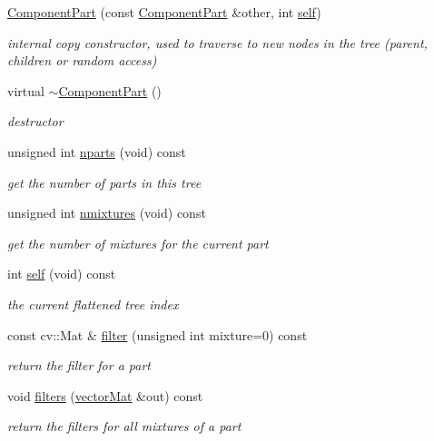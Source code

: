 \begin{DoxyCompactItemize}
\hyperlink{classComponentPart_ac0e19a42768687553d539fef60102310}{Component\-Part} (const \hyperlink{classComponentPart}{Component\-Part} \&other, int \hyperlink{classComponentPart_abe27079725188a3cb881459a6ba0abc5}{self})
\begin{DoxyCompactList}\small\item\em internal copy constructor, used to traverse to new nodes in the tree (parent, children or random access) \end{DoxyCompactList}\item 
virtual \hyperlink{classComponentPart_adc9d76c5af40cbe00a655361f1b61845}{$\sim$\-Component\-Part} ()
\begin{DoxyCompactList}\small\item\em destructor \end{DoxyCompactList}\item 
unsigned int \hyperlink{classComponentPart_a077a73d9777e77da01176248ca292d23}{nparts} (void) const 
\begin{DoxyCompactList}\small\item\em get the number of parts in this tree \end{DoxyCompactList}\item 
unsigned int \hyperlink{classComponentPart_aba1fa81c2745e5974d72f8403ad48063}{nmixtures} (void) const 
\begin{DoxyCompactList}\small\item\em get the number of mixtures for the current part \end{DoxyCompactList}\item 
int \hyperlink{classComponentPart_abe27079725188a3cb881459a6ba0abc5}{self} (void) const 
\begin{DoxyCompactList}\small\item\em the current flattened tree index \end{DoxyCompactList}\item 
const cv\-::\-Mat \& \hyperlink{classComponentPart_aab10c6684b3ef5e7036800761a564b66}{filter} (unsigned int mixture=0) const 
\begin{DoxyCompactList}\small\item\em return the filter for a part \end{DoxyCompactList}\item 
void \hyperlink{classComponentPart_adcad5d5ac3b60c803755813a6872761b}{filters} (\hyperlink{types_8hpp_a3207a7addcfa415d1c83622febcb1e9b}{vector\-Mat} \&out) const 
\begin{DoxyCompactList}\small\item\em return the filters for all mixtures of a part \end{DoxyCompactList}\item 

\end{DoxyCompactItemize}
